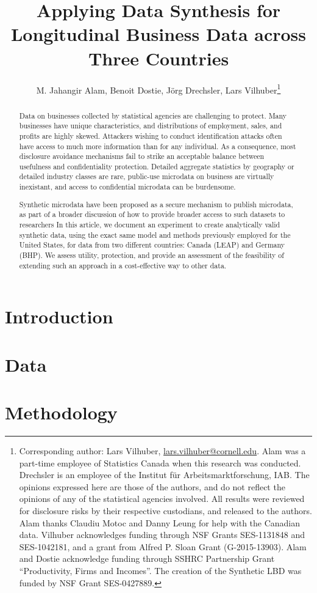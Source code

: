 \documentclass{article}
\title{Applying Data Synthesis for Longitudinal Business Data across Three Countries }
\author{M. Jahangir Alam, Benoit Dostie, J\"org Drechsler, Lars Vilhuber\thanks{Corresponding author: Lars Vilhuber, \href{mailto:lars.vilhuber@cornell.edu}{lars.vilhuber@cornell.edu}. Alam was a part-time employee of Statistics Canada when this research was conducted. Drechsler is an employee of the Institut f\"ur Arbeitsmarktforschung, IAB. The opinions expressed here are those of the authors, and do not reflect the opinions of any of the statistical agencies involved. All results were reviewed for disclosure risks by their respective custodians, and released to the authors. Alam thanks Claudiu Motoc and Danny Leung for help with the Canadian data. Vilhuber acknowledges funding through NSF Grants SES-1131848 and SES-1042181, and a grant from Alfred P. Sloan Grant (G-2015-13903). Alam and Dostie acknowledge funding through SSHRC Partnership Grant ``Productivity, Firms and Incomes''. The creation of the Synthetic LBD  was funded by NSF Grant SES-0427889.}}
\begin{document}
\maketitle
{}
\begin{abstract}
\noindent
Data on businesses collected by statistical agencies are challenging to protect. Many businesses have unique characteristics, and distributions of employment, sales, and profits are highly skewed. Attackers wishing to conduct identification attacks often have access to much more information than for any individual. As a consequence, most disclosure avoidance mechanisms  fail to strike an acceptable balance between usefulness and confidentiality protection. Detailed aggregate statistics by geography or detailed industry classes  are rare, public-use microdata on business are virtually inexistant, and access to confidential microdata can be burdensome. 

Synthetic microdata have been proposed as a secure mechanism to publish microdata, as part of a broader discussion of how  to provide broader access to such datasets to researchers
In this article, we document an experiment to create analytically valid synthetic data, using the exact same model and methods previously employed for the United States, for data from two different countries: Canada (\ac{LEAP}) and Germany (\ac{BHP}). We assess utility, protection, and provide an assessment of the feasibility of extending such an approach in a cost-effective way to other data.

\end{abstract}


\newpage
\tableofcontents
\newpage
\acresetall
\section{Introduction}


\section{Data} 
\label{sec:data}


%

\section{Methodology}
\label{sec:methodology}

\end{document}
